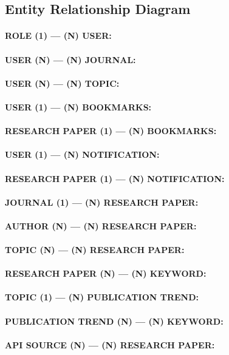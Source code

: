 \subsection{Entity Relationship Diagram}
\paragraph{ROLE (1) — (N) USER:}

\paragraph{USER (N) — (N) JOURNAL:}

\paragraph{USER (N) — (N) TOPIC:}

\paragraph{USER (1) — (N) BOOKMARKS:}

\paragraph{RESEARCH PAPER (1) — (N) BOOKMARKS:}

\paragraph{USER (1) — (N) NOTIFICATION:}

\paragraph{RESEARCH PAPER (1) — (N) NOTIFICATION:}

\paragraph{JOURNAL (1) — (N) RESEARCH PAPER:}

\paragraph{AUTHOR (N) — (N) RESEARCH PAPER:}

\paragraph{TOPIC (N) — (N) RESEARCH PAPER:}

\paragraph{RESEARCH PAPER (N) — (N) KEYWORD:}

\paragraph{ TOPIC (1) — (N) PUBLICATION TREND:}

\paragraph{  PUBLICATION TREND (N) — (N) KEYWORD:}

\paragraph{API SOURCE (N) — (N) RESEARCH PAPER:}